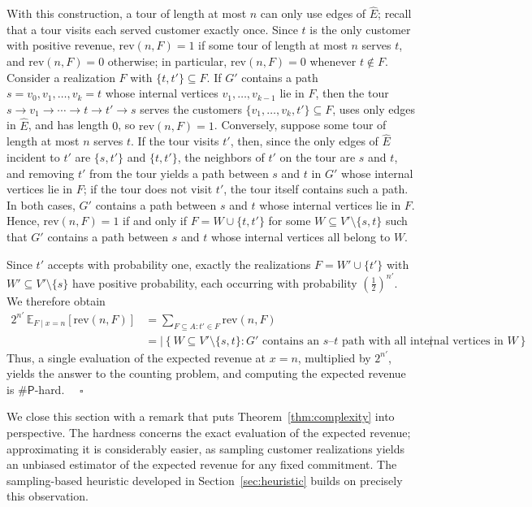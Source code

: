 \documentclass[11pt]{article}
\theoremstyle{plain}
\theoremstyle{definition}
\renewenvironment{proof}[1]{\par\noindent{\itshape #1}\space\ignorespaces}{\par\medskip}
\newcommand{\Halmos}{\ensuremath{\quad\square}}
\begin{document}
\begin{proof}{Proof.}
	With this construction, a tour of length at most $n$ can only use edges of $\hat{E}$; recall that a tour visits each served customer exactly once. Since $t$ is the only customer with positive revenue, $\text{rev}(n, F) = 1$ if some tour of length at most $n$ serves $t$, and $\text{rev}(n, F) = 0$ otherwise; in particular, $\text{rev}(n, F) = 0$ whenever $t \notin F$. Consider a realization $F$ with $\{t, t'\} \subseteq F$. If $G'$ contains a path $s = v_0, v_1, \ldots, v_k = t$ whose internal vertices $v_1, \ldots, v_{k-1}$ lie in $F$, then the tour $s \to v_1 \to \cdots \to t \to t' \to s$ serves the customers $\{v_1, \ldots, v_k, t'\} \subseteq F$, uses only edges in $\hat{E}$, and has length $0$, so $\text{rev}(n, F) = 1$. Conversely, suppose some tour of length at most $n$ serves $t$. If the tour visits $t'$, then, since the only edges of $\hat{E}$ incident to $t'$ are $\{s,t'\}$ and $\{t,t'\}$, the neighbors of $t'$ on the tour are $s$ and $t$, and removing $t'$ from the tour yields a path between $s$ and $t$ in $G'$ whose internal vertices lie in $F$; if the tour does not visit $t'$, the tour itself contains such a path. In both cases, $G'$ contains a path between $s$ and $t$ whose internal vertices lie in $F$. Hence, $\text{rev}(n, F) = 1$ if and only if $F = W \cup \{t, t'\}$ for some $W \subseteq V' \setminus \{s,t\}$ such that $G'$ contains a path between $s$ and $t$ whose internal vertices all belong to $W$.

	Since $t'$ accepts with probability one, exactly the realizations $F = W' \cup \{t'\}$ with $W' \subseteq V' \setminus \{s\}$ have positive probability, each occurring with probability $(\frac{1}{2})^{n'}$. We therefore obtain
	\begin{align*}
		2^{n'}\,\mathbb{E}_{F\mid x=n}\left[ \text{rev}(n, F )\right]
		&= \sum_{F \subseteq A \colon t' \in F} \text{rev}(n, F)\\
		&= \left|\left\{W \subseteq V' \setminus \{s,t\} \colon G' \text{ contains an $s$--$t$ path with all internal vertices in } W\right\}\right|.
	\end{align*}
	Thus, a single evaluation of the expected revenue at $x = n$, multiplied by $2^{n'}$, yields the answer to the counting problem, and computing the expected revenue is $\textsf{\#P}$-hard.
	\Halmos
\end{proof}
	We close this section with a remark that puts Theorem~\ref{thm:complexity} into perspective. The hardness concerns the exact evaluation of the expected revenue; approximating it is considerably easier, as sampling customer realizations yields an unbiased estimator of the expected revenue for any fixed commitment. The sampling-based heuristic developed in Section~\ref{sec:heuristic} builds on precisely this observation.
\end{document}
